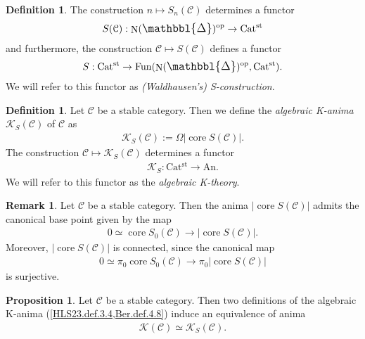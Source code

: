 \documentclass[a4paper,dvipdfmx,11pt,reqno]{amsart}
\DeclareMathOperator{\myop}{op}
\DeclareMathOperator{\N}{N}
\DeclareMathOperator{\Fun}{Fun}
\newcommand{\C}{\mathcal{C}}
\newcommand{\K}{\mathcal{K}}
\DeclareMathOperator{\core}{core}
\newcommand{\An}{\mathrm{An}}
\newcommand{\Catst}{\mathrm{Cat^{st}}}
\newcommand{\prism}{{\mathlarger{\mathbbl{\Delta}}}}
\theoremstyle{definition}
\newtheorem{definition}[theorem]{Definition}
\newtheorem{proposition}[theorem]{Proposition}
\newtheorem{remark}[theorem]{Remark}
\begin{document}
\begin{definition} \label{Ber.rem.4.5}
  The construction $n \mapsto S_n(\C)$ determines a functor 
  \begin{align*}
    S(\C) : \N(\prism)^{\myop} \to \Catst
  \end{align*}
  and furthermore, the construction $\C \mapsto S(\C)$ defines a functor 
  \begin{align*}
    S : \Catst \to \Fun(\N(\prism)^{\myop},\Catst).
  \end{align*}
  We will refer to this functor as \textit{(Waldhausen's) S-construction}.
\end{definition}

\begin{definition} \label{Ber.def.4.8}
  Let $\C$ be a stable category.
  Then we define the \textit{algebraic K-anima} $\K_S(\C)$ of $\C$ as 
  \begin{align*}
    \K_S(\C) := \Omega|\core S(\C)|.
  \end{align*}
  The construction $\C \mapsto \K_S(\C)$ determines a functor 
  \begin{align*}
    \K_S : \Catst \to \An.
  \end{align*}
  We will refer to this functor as the \textit{algebraic K-theory}.
\end{definition}
 
\begin{remark} %
  Let $\C$ be a stable category.
  Then the anima $|\core S(\C)|$ admits the canonical base point given by the map 
  \begin{align*}
    0 \simeq \core S_0(\C) \to |\core S(\C)|.
  \end{align*}
  Moreover, $|\core S(\C)|$ is connected, since the canonical map 
  \begin{align*}
    0 \simeq \pi_0 \core S_0(\C) \to \pi_0 |\core S(\C)|
  \end{align*}
  is surjective.
\end{remark}

\begin{proposition} \label{Ber.prop.4.37}
  Let $\C$ be a stable category.
  Then two definitions of the algebraic K-anima (\cref{HLS23.def.3.4,Ber.def.4.8}) induce an equivalence of anima
  \begin{align*}
    \K(\C) \simeq \K_S(\C).
  \end{align*}
\end{proposition}

\newpage
\end{document}
